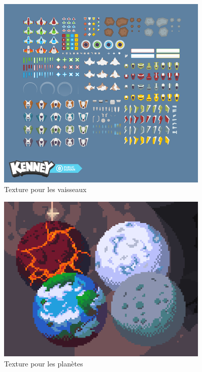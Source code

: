 \begin{figure}[htbp]
\centering
\includegraphics[width=0.9\textwidth]{pics/spaceship_1_preview.png}
\caption[Texture pour les vaisseaux]{\label{figure_simple}Texture pour les vaisseaux}
\end{figure}

\begin{figure}[htbp]
\centering
\includegraphics[width=0.9\textwidth]{pics/planets.png}
\caption[Texture pour les planètes]{\label{figure_simple}Texture pour les planètes}
\end{figure}